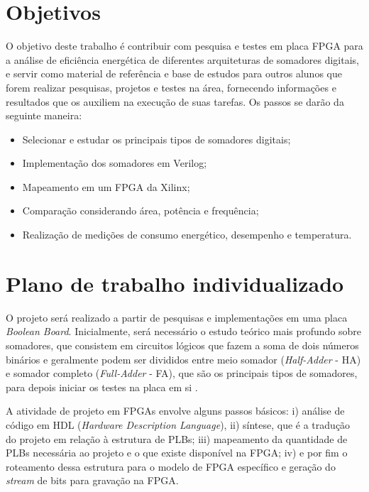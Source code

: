 \documentclass[12pt,consuni]{uftpibic}
\begin{document}
\chapter{Objetivos}

O objetivo deste trabalho é contribuir com pesquisa e testes em placa FPGA para a análise de eficiência energética de diferentes arquiteturas de somadores digitais, e servir como material de referência e base de estudos para outros alunos que forem realizar pesquisas, projetos e testes na área, fornecendo informações e resultados que os auxiliem na execução de suas tarefas. Os passos se darão da seguinte maneira:

\begin{itemize}
\item Selecionar e estudar os principais tipos de somadores digitais;
\item Implementação dos somadores em Verilog;
\item Mapeamento em um FPGA da Xilinx;
\item Comparação considerando área, potência e frequência;
\item Realização de medições de consumo energético, desempenho e temperatura.
\end{itemize}


\vspace{1.5cm}
\chapter{Plano de trabalho individualizado}

O projeto será realizado a partir de pesquisas e implementações em uma placa \textit{Boolean Board}. Inicialmente, será necessário o estudo teórico mais profundo sobre somadores, que consistem em circuitos lógicos que fazem a soma de dois números binários e geralmente podem ser divididos entre meio somador (\textit{Half-Adder} - HA) e somador completo (\textit{Full-Adder} - FA), que são os principais tipos de somadores, para depois iniciar os testes na placa em si \cite{toccisistemas}. 

A atividade de projeto em FPGAs envolve alguns passos básicos: i) análise de código em HDL (\textit{Hardware Description Language}), ii) síntese, que é a tradução do projeto em relação à estrutura de PLBs; iii) mapeamento da quantidade de PLBs necessária ao projeto e o que existe disponível na FPGA; iv) e por fim o roteamento dessa estrutura para o modelo de FPGA específico e geração do \textit{stream} de bits para gravação na FPGA. 
\end{document}
